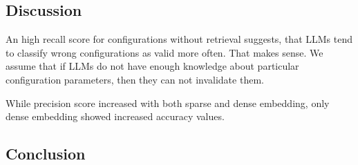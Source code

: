 \subsection{Discussion} \label{sec:exp_discussion}

An high recall score for configurations without retrieval suggests, that LLMs tend to classify wrong configurations as valid more often. That makes sense. We assume that if LLMs do not have enough knowledge about particular configuration parameters, then they can not invalidate them. 

While precision score increased with both sparse and dense embedding, only dense embedding showed increased accuracy values.

\subsection{Conclusion} \label{sec:exp_conclusion}
